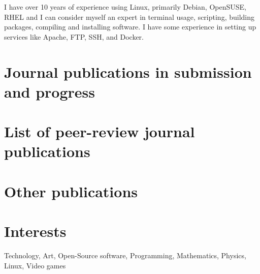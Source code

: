 \documentclass[a4paper,10pt]{article} %
\begin{document}
{I have over 10 years of experience using Linux, primarily Debian, OpenSUSE, RHEL and I can consider myself an expert in terminal usage, scripting, building packages, compiling and installing software.
I have some experience in setting up services like Apache, FTP, SSH, and Docker.


\section{Journal publications in submission and progress}






\section{List of peer-review journal publications}




\section{Other publications}








\section{Interests}

Technology, Art, Open-Source software, Programming, Mathematics, Physics, Linux, Video games


}
\end{document}
